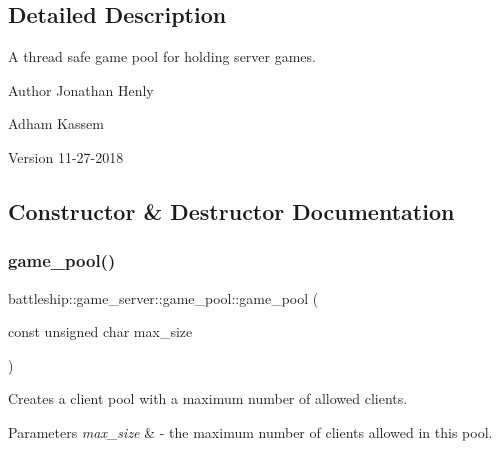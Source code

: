 \subsection{Detailed Description}
A thread safe game pool for holding server games. 

\begin{DoxyAuthor}{Author}
Jonathan Henly 

Adham Kassem 
\end{DoxyAuthor}
\begin{DoxyVersion}{Version}
11-\/27-\/2018 
\end{DoxyVersion}


\subsection{Constructor \& Destructor Documentation}
\mbox{\label{classbattleship_1_1game__server_1_1game__pool_a8f1683759e6491fe84b55409873c8163}} 
\subsubsection{\texorpdfstring{game\+\_\+pool()}{game\_pool()}}
{\footnotesize\ttfamily battleship\+::game\+\_\+server\+::game\+\_\+pool\+::game\+\_\+pool (\begin{DoxyParamCaption}\item[{const unsigned char}]{max\+\_\+size }\end{DoxyParamCaption})\hspace{0.3cm}{\ttfamily [explicit]}}

Creates a client pool with a maximum number of allowed clients.


\begin{DoxyParams}{Parameters}
{\em max\+\_\+size} & -\/ the maximum number of clients allowed in this pool. \\
\hline
\end{DoxyParams}
\mbox{\label{classbattleship_1_1game__server_1_1game__pool_a595c7d278fc0163b37780d90663663a2}} 
